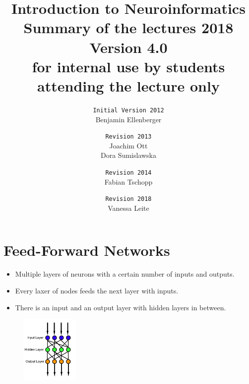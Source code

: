 \documentclass[a4paper, 12pt]{article}
\title{\textbf{Introduction to Neuroinformatics} \\Summary of the lectures
2018\\\normalsize Version 4.0 \\
for internal use by students attending the lecture only}
\author{
\texttt{Initial Version 2012}\\
	Benjamin Ellenberger
\and
\texttt{Revision 2013}\\
	Joachim Ott\\Dora Sumislawska
\and
\texttt{Revision 2014}\\
	Fabian Tschopp
\and
\texttt{Revision 2018}\\
	Vanessa Leite}
\date{}
\begin{document}
\maketitle
\newpage
\tableofcontents
\newpage

\newpage

























\newpage


\section{Feed-Forward Networks}
\begin{itemize}[noitemsep,nolistsep]
	\item Multiple layers of neurons with a certain number of inputs and outputs.
	\item Every laxer of nodes feeds the next layer with inputs.
	\item There is an input and an output layer with hidden layers in between.
\end{itemize}
\begin{figure}[H]
	\includegraphics[width=0.25\textwidth]{Feed_forward_neural_net.png}
\end{figure}
\end{document}
